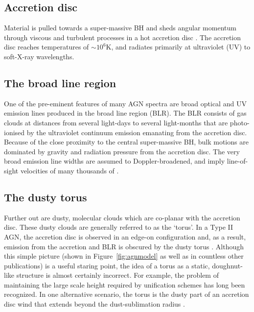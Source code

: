 \subsection{Accretion disc}

Material is pulled towards a super-massive BH and sheds angular momentum through viscous and turbulent processes in a hot accretion disc \citep[e.g.][]{begelman85}. 
The accretion disc reaches temperatures of $\sim$$10^6$K, and radiates primarily at ultraviolet (UV) to soft-X-ray wavelengths. 

\subsection{The broad line region}

One of the pre-eminent features of many AGN spectra are broad optical and UV emission lines produced in the broad line region (BLR). 
The BLR consists of gas clouds at distances from several light-days to several light-months that are photo-ionised by the ultraviolet continuum emission emanating from the accretion disc.  
Because of the close proximity to the central super-massive BH, bulk motions are dominated by gravity and radiation pressure from the accretion disc.
The very broad emission line widths are assumed to Doppler-broadened, and imply line-of-sight velocities of many thousands of \kms. 

\subsection{The dusty torus}

Further out are dusty, molecular clouds which are co-planar with the accretion disc. 
These dusty clouds are generally referred to as the `torus'. 
In a Type II AGN, the accretion disc is observed in an edge-on configuration and, as a result, emission from the accretion and BLR is obscured by the dusty torus \citep[e.g.][]{antonucci93}.
Although this simple picture (shown in Figure~\ref{fig:agnmodel} as well as in countless other publications) is a useful staring point, the idea of a torus as a static, doughnut-like structure is almost certainly incorrect. 
For example, the problem of maintaining the large scale height required by unification schemes has long been recognized. 
In one alternative scenario, the torus is the dusty part of an accretion disc wind that extends beyond the dust-sublimation radius \citep[e.g.][]{konigl94,everett09,gallagher12,everett05,keating12,elitzur06}. 

